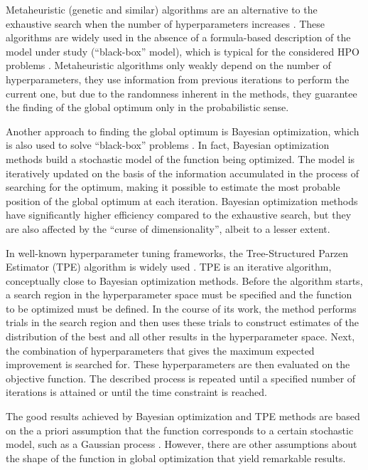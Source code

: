 \documentclass[preprint,12pt]{elsarticle}
\begin{document}
Metaheuristic (genetic and similar) algorithms are an alternative to the exhaustive search when the number of hyperparameters increases \cite{Opara2019}. These algorithms are widely used in the absence of a formula-based description of the model under study (``black-box'' model), which is typical for the considered HPO problems \cite{Zhou2021,Yang2022}. Metaheuristic algorithms only weakly depend on the number of hyperparameters, they use information from previous iterations to perform the current one, but due to the randomness inherent in the methods, they guarantee the finding of the global optimum only in the probabilistic sense.

Another approach to finding the global optimum is Bayesian optimization, which is also used to solve ``black-box'' problems \cite{Frazier2018,Archetti2019}. In fact, Bayesian optimization methods build a stochastic model of the function being optimized. The model is iteratively updated on the basis of the information accumulated in the process of searching for the optimum, making it possible to estimate the most probable position of the global optimum at each iteration. Bayesian optimization methods have significantly higher efficiency compared to the exhaustive search, but they are also affected by the ``curse of dimensionality'', albeit to a lesser extent. 

In well-known hyperparameter tuning frameworks, the Tree-Structured Parzen Estimator (TPE) algorithm is widely used \cite{hyperopt,NIPS2011}. TPE is an iterative algorithm, conceptually close to Bayesian optimization methods. Before the algorithm starts, a search region in the hyperparameter space must be specified and the function to be optimized must be defined. In the course of its work, the method performs trials in the search region and then uses these trials to construct estimates of the distribution of the best and all other results in the hyperparameter space. Next, the combination of hyperparameters that gives the maximum expected improvement is searched for. These hyperparameters are then evaluated on the objective function. The described process is repeated until a specified number of iterations is attained or until the time constraint is reached.  

The good results achieved by Bayesian optimization \cite{Joy2020} and TPE \cite{Watanabe2022a,Watanabe2022b} methods are based on the a priori assumption that the function corresponds to a certain stochastic model, such as a Gaussian process \cite{Rasmussen2005}. However, there are other assumptions about the shape of the function in global optimization that yield remarkable results. 
\end{document}
